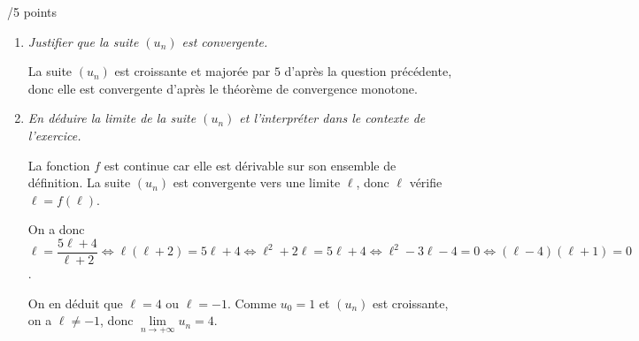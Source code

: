 \documentclass[a4paper]{article}
\begin{document}
\begin{exerciceinterro}{\hspace{2cm}/5 points}{}
\begin{enumerate}
		\begin{align*}
			& 0\leqslant u_k \leqslant u_{k+1}  \leqslant  5 \\
			\iff & f(0) \leqslant f(u_k) \leqslant f(u_{k+1})  \leqslant  f(5) \text{ (car $f$ est strictement croissante)}\\
			\iff & 2 \leqslant u_{k+1} \leqslant u_{k+2}  \leqslant  \dfrac{29}{7} \\
			\Longrightarrow & 0 \leqslant u_{k+1} \leqslant u_{k+2}  \leqslant  5
		\end{align*}

		$\mathcal{P}(k+1)$ est donc vraie.

		\underline{Conclusion}:
		On a $P(0)$ vraie et pour tout entier $k$, $P(k) \Longrightarrow P(k+1)$, donc par le principe de récurrence, pour tout entier naturel $n$, $0 \leqslant u_n \leqslant u_{n+1}  \leqslant  5$.


		\item \textit{Justifier que la suite $\left(u_n\right)$ est convergente.}
		
		La suite $(u_n)$ est croissante et majorée par $5$ d'après la question précédente, donc elle est convergente d'après le théorème de convergence monotone.

\item \textit{En déduire la limite de la suite $\left(u_n\right)$ et l'interpréter dans le contexte de l'exercice.}

		La fonction $f$ est continue car elle est dérivable sur son ensemble de définition. La suite $(u_n)$ est convergente vers une limite $\ell$, donc $\ell$ vérifie $\ell=f(\ell)$.

		On a donc $\ell=\dfrac{5\ell+4}{\ell+2} \iff \ell(\ell+2)=5\ell+4 \iff \ell^2+2\ell=5\ell+4 \iff \ell^2-3\ell-4=0 \iff (\ell-4)(\ell+1)=0$.

		On en déduit que $\ell=4$ ou $\ell=-1$. Comme $u_0=1$ et $(u_n)$ est croissante, on a $\ell\neq -1$, donc $\lim\limits_{n \to +\infty} u_n=4$.


\end{enumerate}

\end{exerciceinterro}

\pagebreak
 
\end{document}
